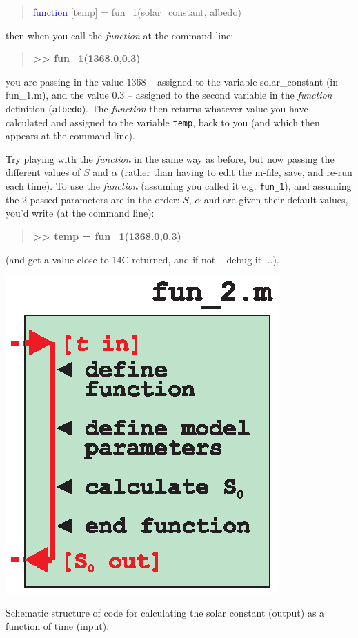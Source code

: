 \documentclass{tufte-book} %
\newenvironment{docspec}{\begin{quotation}\ttfamily\parskip0pt\parindent0pt\ignorespaces}{\end{quotation}}
\newenvironment{docspecbold}{\begin{quotation}\ttfamily\bfseries\parskip0pt\parindent0pt\ignorespaces}{\end{quotation}}
\begin{document}
\begin{docspec}
\textcolor{blue}{function} [temp] = fun\_1(solar\_constant, albedo)
\end{docspec}
then when you call the \textit{function}  at the command line:
\begin{docspecbold}
>> fun\_1(1368.0,0.3)
\end{docspecbold}
you are passing in the value \(1368\) -- assigned to the variable solar\_constant (in \textsf{fun\_1.m}), and the value \(0.3\) --  assigned to the second variable in the \textit{function} definition (\texttt{albedo}). The \textit{function} then returns whatever value you have calculated and assigned to the variable \texttt{temp}, back to you (and which then appears at the command line).

Try playing with the \textit{function} in the same way as before, but now passing the different values of \(S\) and \(\alpha\) (rather than having to edit the \textsf{m-file}, save, and re-run each time). To use the \textit{function} (assuming you called it e.g. \texttt{fun\_1}), and assuming the 2 passed parameters are in the order: \(S\), \(\alpha\) and are given their default values, you'd write (at the command line):
\begin{docspecbold}
>> temp = fun\_1(1368.0,0.3)
\end{docspecbold}
(and get a value close to 14\degree C returned, and if not -- debug it ...).


\begin{marginfigure}[0.5in]
\includegraphics[width=\linewidth]{ch8-schematic-fun2.eps}
\caption{Schematic structure of code for calculating the solar constant (output) as a function of time (input).}
\label{fig:ch8-schematic-fun2}
\end{marginfigure}
\end{document}
